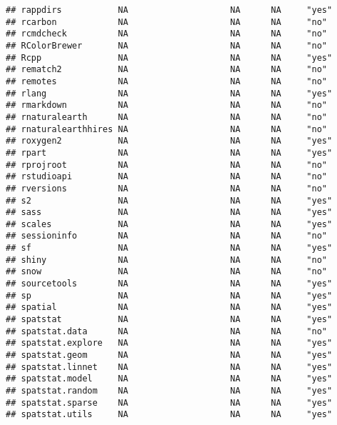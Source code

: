\documentclass[
]{article}
\begin{document}
\begin{verbatim}
## rappdirs           NA                    NA      NA     "yes"           
## rcarbon            NA                    NA      NA     "no"            
## rcmdcheck          NA                    NA      NA     "no"            
## RColorBrewer       NA                    NA      NA     "no"            
## Rcpp               NA                    NA      NA     "yes"           
## rematch2           NA                    NA      NA     "no"            
## remotes            NA                    NA      NA     "no"            
## rlang              NA                    NA      NA     "yes"           
## rmarkdown          NA                    NA      NA     "no"            
## rnaturalearth      NA                    NA      NA     "no"            
## rnaturalearthhires NA                    NA      NA     "no"            
## roxygen2           NA                    NA      NA     "yes"           
## rpart              NA                    NA      NA     "yes"           
## rprojroot          NA                    NA      NA     "no"            
## rstudioapi         NA                    NA      NA     "no"            
## rversions          NA                    NA      NA     "no"            
## s2                 NA                    NA      NA     "yes"           
## sass               NA                    NA      NA     "yes"           
## scales             NA                    NA      NA     "yes"           
## sessioninfo        NA                    NA      NA     "no"            
## sf                 NA                    NA      NA     "yes"           
## shiny              NA                    NA      NA     "no"            
## snow               NA                    NA      NA     "no"            
## sourcetools        NA                    NA      NA     "yes"           
## sp                 NA                    NA      NA     "yes"           
## spatial            NA                    NA      NA     "yes"           
## spatstat           NA                    NA      NA     "yes"           
## spatstat.data      NA                    NA      NA     "no"            
## spatstat.explore   NA                    NA      NA     "yes"           
## spatstat.geom      NA                    NA      NA     "yes"           
## spatstat.linnet    NA                    NA      NA     "yes"           
## spatstat.model     NA                    NA      NA     "yes"           
## spatstat.random    NA                    NA      NA     "yes"           
## spatstat.sparse    NA                    NA      NA     "yes"           
## spatstat.utils     NA                    NA      NA     "yes"           

\end{verbatim}
\end{document}
